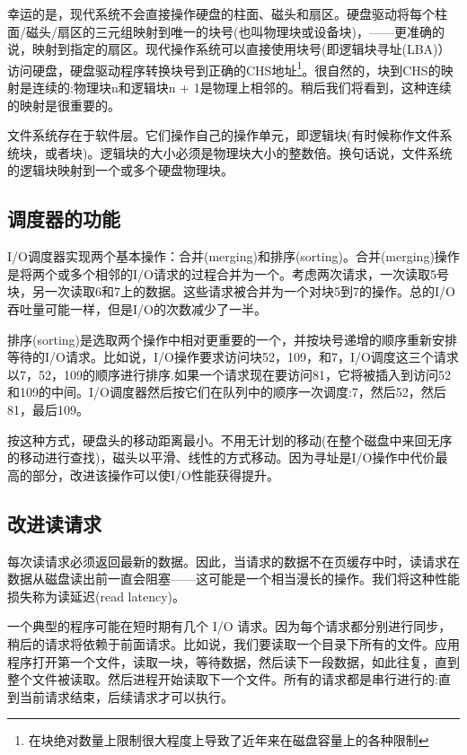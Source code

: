 幸运的是，现代系统不会直接操作硬盘的柱面、磁头和扇区。硬盘驱动将每个柱面/磁头/扇区的三元组映射到唯一的块号(也叫物理块或设备块)，——更准确的说，映射到指定的扇区。现代操作系统可以直接使用块号(即逻辑块寻址(LBA)）访问硬盘，硬盘驱动程序转换块号到正确的CHS地址\footnote[1]{在块绝对数量上限制很大程度上导致了近年来在磁盘容量上的各种限制}。很自然的，块到CHS的映射是连续的:物理块n和逻辑块n + 1是物理上相邻的。稍后我们将看到，这种连续的映射是很重要的。

文件系统存在于软件层。它们操作自己的操作单元，即逻辑块(有时候称作文件系统块，或者块)。逻辑块的大小必须是物理块大小的整数倍。换句话说，文件系统的逻辑块映射到一个或多个硬盘物理块。

\subsection{调度器的功能}

I/O调度器实现两个基本操作：合并(merging)和排序(sorting)。合并(merging)操作是将两个或多个相邻的I/O请求的过程合并为一个。考虑两次请求，一次读取5号块，另一次读取6和7上的数据。这些请求被合并为一个对块5到7的操作。总的I/O吞吐量可能一样，但是I/O的次数减少了一半。
     
排序(sorting)是选取两个操作中相对更重要的一个，并按块号递增的顺序重新安排等待的I/O请求。比如说，I/O操作要求访问块52，109，和7，I/O调度这三个请求以7，52，109的顺序进行排序.如果一个请求现在要访问81，它将被插入到访问52和109的中间。I/O调度器然后按它们在队列中的顺序一次调度:7，然后52，然后81，最后109。

按这种方式，硬盘头的移动距离最小。不用无计划的移动(在整个磁盘中来回无序的移动进行查找)，磁头以平滑、线性的方式移动。因为寻址是I/O操作中代价最高的部分，改进该操作可以使I/O性能获得提升。

\subsection{改进读请求}

每次读请求必须返回最新的数据。因此，当请求的数据不在页缓存中时，读请求在数据从磁盘读出前一直会阻塞——这可能是一个相当漫长的操作。我们将这种性能损失称为读延迟(read latency)。

一个典型的程序可能在短时期有几个 I/O 请求。因为每个请求都分别进行同步，稍后的请求将依赖于前面请求。比如说，我们要读取一个目录下所有的文件。应用程序打开第一个文件，读取一块，等待数据，然后读下一段数据，如此往复，直到整个文件被读取。然后进程开始读取下一个文件。所有的请求都是串行进行的:直到当前请求结束，后续请求才可以执行。

